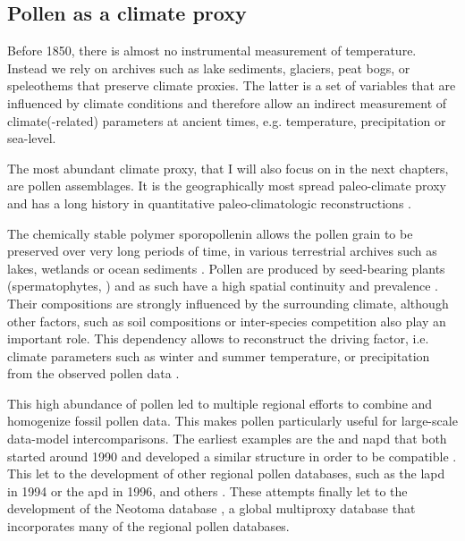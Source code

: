 \begin{refsection}
\subsection{Pollen as a climate proxy}  \label{sec:intro-paleo-data}
Before 1850, there is almost no instrumental measurement of temperature. Instead we rely on archives such as lake sediments, glaciers, peat bogs, or speleothems that preserve climate proxies. The latter is a set of variables that are influenced by climate conditions and therefore allow an indirect measurement of climate(-related) parameters at ancient times, e.g. temperature, precipitation or sea-level. 

The most abundant climate proxy, that I will also focus on in the next chapters, are pollen assemblages. It is the  geographically most spread paleo-climate proxy \citep{BirksBirks1980} and has a long history in quantitative paleo-climatologic reconstructions \citep[e.g.][]{Nichols1967, Nichols1969, Bradley1985, Iversen1944}.

The chemically stable polymer sporopollenin allows the pollen grain to be preserved over very long periods of time, in various terrestrial archives such as lakes, wetlands or ocean sediments \citep{FaegriKalandKrzywinski1989, Havinga1967}. Pollen are produced by seed-bearing plants (spermatophytes, \cite{Wodehouse1935}) and as such have a high spatial continuity and prevalence \citep{ChevalierDavisGajewskiEtAlinprep}. Their compositions are strongly influenced by the surrounding climate, although other factors, such as soil compositions or inter-species competition also play an important role. This dependency allows to reconstruct the driving factor, i.e. climate parameters such as winter and summer temperature, or precipitation from the observed pollen data \citep{JugginsBirks2012,Juggins2013,BrewerGuiotBarboni2007, ChevalierDavisGajewskiEtAlinprep}.

This high abundance of pollen led to multiple regional efforts to combine and homogenize fossil pollen data. This makes pollen particularly useful for large-scale data-model intercomparisons. The earliest examples are the  and \gls{napd}  that both started around 1990 and developed a similar structure in order to be compatible \citep{Grimm2008, FyfeBeaulieuBinneyEtAl2009} . This let to the development of other regional pollen databases, such as the \gls{lapd} \citep{FlantuaHooghiemstraGrimmEtAl2015, MarchantAlmeidaBehlingEtAl2002} in 1994 or the \gls{apd} \citep{VincensLezineBuchetEtAl2007} in 1996, and others \citep[see][]{Grimm2008}. These attempts finally let to the development of the Neotoma database \citep{WilliamsGrimmBloisEtAl2018}, a global multiproxy database that incorporates many of the regional pollen databases.


\end{refsection}
